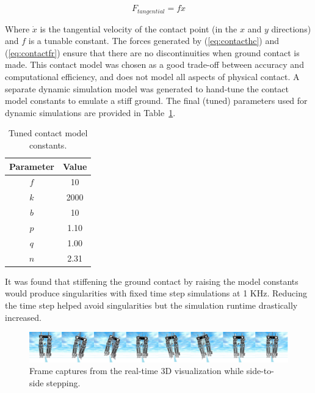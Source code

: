 \begin{equation}
	\label{eq:contactfr}
	{F_{tangential}} = f{\dot x}
\end{equation}

Where $\dot x$ is the tangential velocity of the contact point (in the $x$ and $y$ directions) and $f$ is a tunable constant. The forces generated by (\ref{eq:contacthc}) and (\ref{eq:contactfr}) ensure that there are no discontinuities when ground contact is made. This contact model was chosen as a good trade-off between accuracy and computational efficiency, and does not model all aspects of physical contact. A separate dynamic simulation model was generated to hand-tune the contact model constants to emulate a stiff ground. The final (tuned) parameters used for dynamic simulations are provided in Table~\ref{tab:contactk}.

\begin{table}[!h]
  \centering
  \caption{Tuned contact model constants.}
    \begin{tabular}{cc}
    \addlinespace
    \toprule
    \textbf{Parameter} & \textbf{Value}\\
    \midrule
	$f$	&	10 \\
    $k$	&	2000 \\
    $b$	&	10 \\
    $p$	&	1.10 \\
    $q$  &	1.00 \\
    $n$	&	2.31 \\
    \bottomrule
    \end{tabular}
  \label{tab:contactk}
\end{table}

It was found that stiffening the ground contact by raising the model constants would produce singularities with fixed time step simulations at 1 KHz. Reducing the time step helped avoid singularities but the simulation runtime drastically increased. 

\begin{figure}[!b]
	\centering
    \includegraphics[scale=0.095]{fig/simulations/sidesequence.png}
  	\caption{Frame captures from the real-time 3D visualization while side-to-side stepping.}
	\label{fig:sidesequence}
\end{figure}

